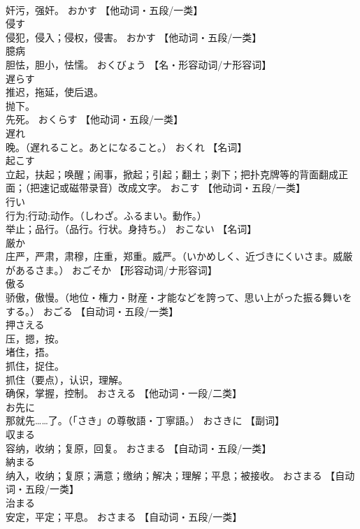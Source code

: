 \documentclass[8pt]{extreport}
\begin{document}
\begin{CJK}{UTF8}{min}
\\	奸污，强奸。	おかす		【他动词・五段/一类】
\\	侵す	
\\	侵犯，侵入；侵权，侵害。	おかす		【他动词・五段/一类】
\\	臆病	
\\	胆怯，胆小，怯懦。	おくびょう		【名・形容动词/ナ形容词】
\\	遅らす	
\\	推迟，拖延，使后退。 
\\	抛下。 
\\	先死。	おくらす		【他动词・五段/一类】
\\	遅れ	
\\	晚。（遅れること。あとになること。）	おくれ		【名词】
\\	起こす	
\\	立起，扶起；唤醒；闹事，掀起；引起；翻土；剥下；把扑克牌等的背面翻成正面；（把速记或磁带录音）改成文字。	おこす		【他动词・五段/一类】
\\	行い	
\\	行为;行动;动作。（しわざ。ふるまい。動作。） 
\\	举止；品行。（品行。行状。身持ち。）	おこない		【名词】
\\	厳か	
\\	庄严，严肃，肃穆，庄重，郑重。威严。（いかめしく、近づきにくいさま。威厳があるさま。）	おごそか		【形容动词/ナ形容词】
\\	傲る	
\\	骄傲，傲慢。（地位・権力・財産・才能などを誇って、思い上がった振る舞いをする。）	おごる		【自动词・五段/一类】
\\	押さえる	
\\	压，摁，按。 
\\	堵住，捂。 
\\	抓住，捉住。 
\\	抓住（要点），认识，理解。 
\\	确保，掌握，控制。	おさえる		【他动词・一段/二类】
\\	お先に	
\\	那就先……了。（「さき」の尊敬語・丁寧語。）	おさきに		【副词】
\\	収まる	
\\	容纳，收纳；复原，回复。	おさまる		【自动词・五段/一类】
\\	納まる	
\\	纳入，收纳；复原；满意；缴纳；解决；理解；平息；被接收。	おさまる		【自动词・五段/一类】
\\	治まる	
\\	安定，平定；平息。	おさまる		【自动词・五段/一类】

\end{CJK}
\end{document}
